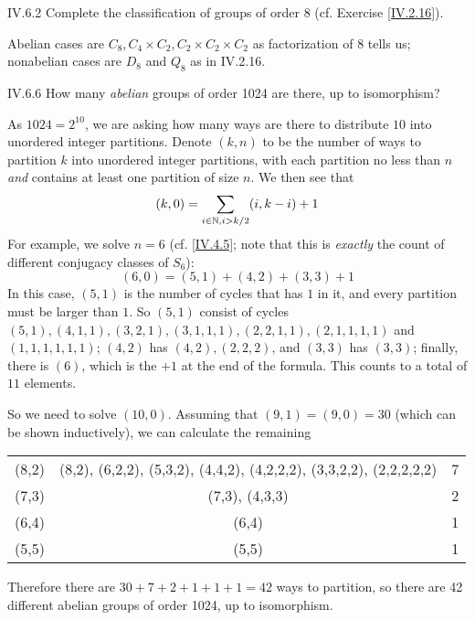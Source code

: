 \begin{problem}{IV.6.2}
Complete the classification of groups of order 8 (cf. Exercise \ref{IV.2.16}).
\end{problem}
\begin{solution}
Abelian cases are $C_8, C_4 \times C_2, C_2 \times C_2 \times C_2$ as factorization of $8$ tells us; nonabelian cases are $D_8$ and $Q_8$ as in IV.2.16.
\end{solution}

\begin{problem}{IV.6.6}
How many \emph{abelian} groups of order 1024 are there, up to isomorphism?
\end{problem}
\begin{solution}
As $1024 = 2^{10}$, we are asking how many ways are there to distribute $10$ into unordered integer partitions. Denote $(k,n)$ to be the number of ways to partition $k$ into unordered integer partitions, with each partition no less than $n$ \emph{and} contains at least one partition of size $n$. We then see that 
\[
(k,0) = \sum_{i \in \mathbb{N}, i > k/2} (i,k-i) + 1
\]
For example, we solve $n=6$ (cf. \ref{IV.4.5}; note that this is \emph{exactly} the count of different conjugacy classes of $S_6$):
\[
(6,0) = (5,1)+(4,2)+(3,3)+1
\]
In this case, $(5,1)$ is the number of cycles that has $1$ in it, and every partition must be larger than $1$. So $(5,1)$ consist of cycles $(5,1),(4,1,1),(3,2,1),(3,1,1,1),(2,2,1,1),(2,1,1,1,1)$ and $(1,1,1,1,1,1)$; $(4,2)$ has $(4,2),(2,2,2)$, and $(3,3)$ has $(3,3)$; finally, there is $(6)$, which is the $+1$ at the end of the formula. This counts to a total of $11$ elements.

So we need to solve $(10,0)$. Assuming that $(9,1) = (9,0) = 30$ (which can be shown inductively), we can calculate the remaining
\begin{center}
\begin{tabular}{c|c|c}
(8,2) &(8,2), (6,2,2), (5,3,2), (4,4,2), (4,2,2,2), (3,3,2,2), (2,2,2,2,2) &7 \\
(7,3) &(7,3), (4,3,3) &2\\
(6,4) &(6,4) &1\\
(5,5) &(5,5) &1\\
\end{tabular}	
\end{center}
Therefore there are $30+7+2+1+1+1 = 42$ ways to partition, so there are 42 different abelian groups of order 1024, up to isomorphism.
\end{solution}